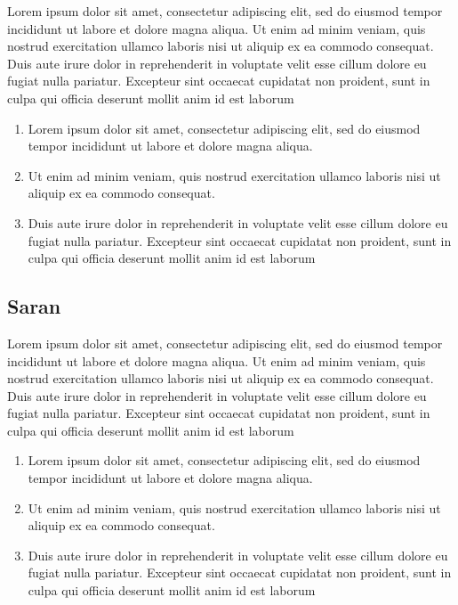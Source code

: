 \documentclass[
]{article}
\begin{document}
Lorem ipsum dolor sit amet, consectetur adipiscing elit, sed do eiusmod
tempor incididunt ut labore et dolore magna aliqua. Ut enim ad minim
veniam, quis nostrud exercitation ullamco laboris nisi ut aliquip ex ea
commodo consequat. Duis aute irure dolor in reprehenderit in voluptate
velit esse cillum dolore eu fugiat nulla pariatur. Excepteur sint
occaecat cupidatat non proident, sunt in culpa qui officia deserunt
mollit anim id est laborum

\begin{enumerate}
\def\labelenumi{\arabic{enumi}.}
\item
  Lorem ipsum dolor sit amet, consectetur adipiscing elit, sed do
  eiusmod tempor incididunt ut labore et dolore magna aliqua.
\item
  Ut enim ad minim veniam, quis nostrud exercitation ullamco laboris
  nisi ut aliquip ex ea commodo consequat.
\item
  Duis aute irure dolor in reprehenderit in voluptate velit esse cillum
  dolore eu fugiat nulla pariatur. Excepteur sint occaecat cupidatat non
  proident, sunt in culpa qui officia deserunt mollit anim id est
  laborum
\end{enumerate}

\hypertarget{saran}{%
\subsection{Saran}\label{saran}}

Lorem ipsum dolor sit amet, consectetur adipiscing elit, sed do eiusmod
tempor incididunt ut labore et dolore magna aliqua. Ut enim ad minim
veniam, quis nostrud exercitation ullamco laboris nisi ut aliquip ex ea
commodo consequat. Duis aute irure dolor in reprehenderit in voluptate
velit esse cillum dolore eu fugiat nulla pariatur. Excepteur sint
occaecat cupidatat non proident, sunt in culpa qui officia deserunt
mollit anim id est laborum

\begin{enumerate}
\def\labelenumi{\arabic{enumi}.}
\item
  Lorem ipsum dolor sit amet, consectetur adipiscing elit, sed do
  eiusmod tempor incididunt ut labore et dolore magna aliqua.
\item
  Ut enim ad minim veniam, quis nostrud exercitation ullamco laboris
  nisi ut aliquip ex ea commodo consequat.
\item
  Duis aute irure dolor in reprehenderit in voluptate velit esse cillum
  dolore eu fugiat nulla pariatur. Excepteur sint occaecat cupidatat non
  proident, sunt in culpa qui officia deserunt mollit anim id est
  laborum
\end{enumerate}
\end{document}
